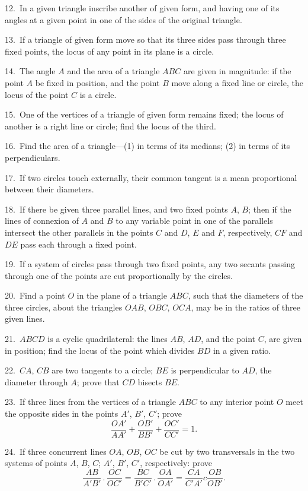 \documentclass[oneside]{book}
\begin{document}
\begin{footnotesize}
12.~In a given triangle inscribe another of given form, and
having one of its angles at a given point in one of the sides of
the original triangle.

13.~If a triangle of given form move so that its three sides
pass through three fixed points, the locus of any point in its
plane is a circle.

14.~The angle $A$ and the area of a triangle $ABC$ are given in
magnitude: if the point $A$ be fixed in position, and the point $B$
move along a fixed line or circle, the locus of the point $C$ is a
circle.

15.~One of the vertices of a triangle of given form remains
fixed; the locus of another is a right line or circle; find the
locus of the third.

16.~Find the area of a triangle---(1) in terms of its medians;
(2) in terms of its perpendiculars.

17.~If two circles touch externally, their common tangent is a
mean proportional between their diameters.

18.~If there be given three parallel lines, and two fixed points
$A$, $B$; then if the lines of connexion of $A$ and $B$ to any variable
point in one of the parallels intersect the other parallels in the
points $C$ and $D$, $E$ and $F$, respectively, $CF$ and $DE$ pass each
through a fixed point.

19.~If a system of circles pass through two fixed points, any
two secants passing through one of the points are cut proportionally
by the circles.

20.~Find a point\label{poiat} $O$ in the plane of a triangle $ABC$, such that
the diameters of the three circles, about the triangles $OAB$, $OBC$,
$OCA$, may be in the ratios of three given lines.

21.~$ABCD$ is a cyclic quadrilateral: the lines $AB$, $AD$, and
the point $C$, are given in position; find the locus of the point
which divides $BD$ in a given ratio.

22.~$CA$, $CB$ are two tangents to a circle; $BE$ is perpendicular
to $AD$, the diameter through $A$; prove that $CD$ bisects $BE$.

23.~If three lines from the vertices of a triangle $ABC$ to any
interior point $O$ meet the opposite sides in the points $A'$, $B'$, $C'$;
prove
\[
   \frac{OA'}{AA'} + \frac{OB'}{BB'} + \frac{OC'}{CC'} = 1.
\]

24.~If three concurrent lines $OA$, $OB$, $OC$ be cut by two
transversals in the two systems of points $A$, $B$, $C$; $A'$, $B'$, $C'$,
respectively: prove
\[
  \frac{AB}{A'B'} \,.\, \frac{OC}{OC'}
= \frac{BC}{B'C'} \,.\, \frac{OA}{OA'}
= \frac{CA}{C'A'} c \frac{OB}{OB'}.
\]


\end{footnotesize}
\end{document}
